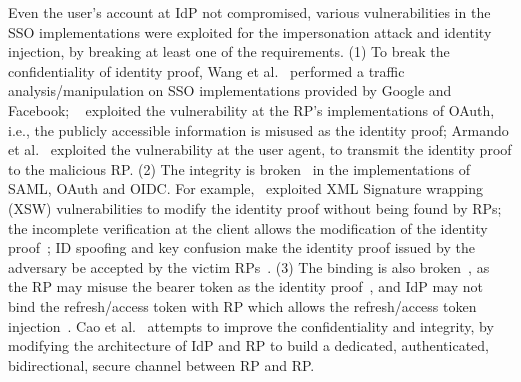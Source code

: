Even the user's account at IdP not compromised, various vulnerabilities in the SSO implementations were exploited for the impersonation attack and identity injection, by
 breaking at least one of the requirements. %
(1) To break the confidentiality of identity proof,  Wang et al.~\cite{WangCW12} performed a traffic analysis/manipulation on SSO implementations provided by Google and Facebook; ~\cite{ZhouE14,WangZLG16,YangLLZH16} exploited the vulnerability at the RP's implementations of OAuth, i.e., the publicly accessible information is misused as the identity proof;
Armando et al.~\cite{ArmandoCCCPS13} exploited the vulnerability at the user agent, to transmit the identity proof to the malicious RP.
(2) The integrity is broken~\cite{SomorovskyMSKJ12,WangCW12,ZhouE14,WangZLG16,YangLLZH16,MainkaMS16, MainkaMSW17} in the implementations of  SAML, OAuth and OIDC.
For example,~\cite{SomorovskyMSKJ12} exploited XML Signature wrapping (XSW) vulnerabilities to modify the identity proof without being found by RPs; 
the incomplete verification at the client allows the modification of the identity proof~\cite{ZhouE14,WangZLG16,YangLLZH16}; 
ID spoofing and key confusion make the identity proof issued by the adversary be accepted by the victim RPs~\cite{MainkaMS16, MainkaMSW17}.
(3) The binding is also broken~\cite{ZhouE14,WangZLG16,YangLLZH16,YangLCZ18}, as the RP may misuse the bearer token  as the identity proof~\cite{ZhouE14,WangZLG16,YangLLZH16}, and IdP may not bind the refresh/access token with RP which allows the refresh/access token injection~\cite{YangLCZ18}.
Cao et al.~\cite{CaoSBKVC14} attempts to improve the confidentiality and integrity, by modifying the architecture of IdP and RP to 
 build a dedicated, authenticated, bidirectional, secure channel between RP and RP.


